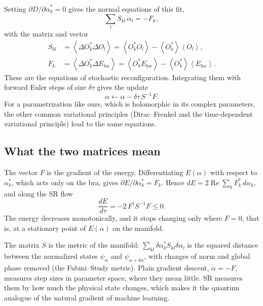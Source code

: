 \documentclass[aps,prb,preprint,amsmath,amssymb,nofootinbib,longbibliography]{revtex4-2}
\newcommand{\ev}[1]{\left\langle #1 \right\rangle}
\newcommand{\Eloc}{E_{\mathrm{loc}}}
\newcommand{\dtau}{\delta\tau}
\renewcommand{\Re}{\operatorname{Re}}
\begin{document}
Setting $\partial D/\partial\dot\alpha_k^* = 0$ gives the normal equations of this fit,
\begin{equation}
  \sum_l S_{kl}\,\dot\alpha_l = -F_k ,
  \label{eq:sr}
\end{equation}
with the matrix and vector
\begin{align}
  S_{kl} &= \ev{\Delta O_k^* \Delta O_l} = \ev{O_k^* O_l} - \ev{O_k^*}\ev{O_l}, \label{eq:S} \\
  F_k &= \ev{\Delta O_k^* \Delta\Eloc} = \ev{O_k^* \Eloc} - \ev{O_k^*}\ev{\Eloc} . \label{eq:F}
\end{align}
These are the equations of stochastic reconfiguration.\cite{sorella1998,carleo2017} Integrating them
with forward Euler steps of size $\dtau$ gives the update
\begin{equation}
  \alpha \leftarrow \alpha - \dtau\, S^{-1} F .
  \label{eq:update}
\end{equation}
For a parametrization like ours, which is holomorphic in its complex parameters, the other common variational
principles (Dirac--Frenkel and the time-dependent variational principle) lead to the same
equations.\cite{yuan2019}

\subsection{What the two matrices mean}

The vector $F$ is the gradient of the energy. Differentiating $E(\alpha)$ with respect to $\alpha_k^*$, which acts only
on the bra, gives $\partial E/\partial\alpha_k^* = F_k$. Hence $dE = 2\Re\sum_k F_k^*\,d\alpha_k$, and along the SR
flow
\begin{equation}
  \frac{dE}{d\tau} = -2\,F^\dagger S^{-1} F \le 0 .
  \label{eq:descent}
\end{equation}
The energy decreases monotonically, and it stops changing only where $F = 0$, that is, at a stationary point of
$E(\alpha)$ on the manifold.

The matrix $S$ is the metric of the manifold: $\sum_{kl}\delta\alpha_k^* S_{kl}\delta\alpha_l$ is the squared
distance between the normalized states $\psi_\alpha$ and $\psi_{\alpha+\delta\alpha}$, with changes of norm and global
phase removed (the Fubini--Study metric). Plain gradient descent, $\dot\alpha = -F$, measures step sizes in parameter
space, where they mean little. SR measures them by how much the physical state changes, which makes it the
quantum analogue of the natural gradient of machine learning.\cite{amari1998,stokes2020}
\end{document}
